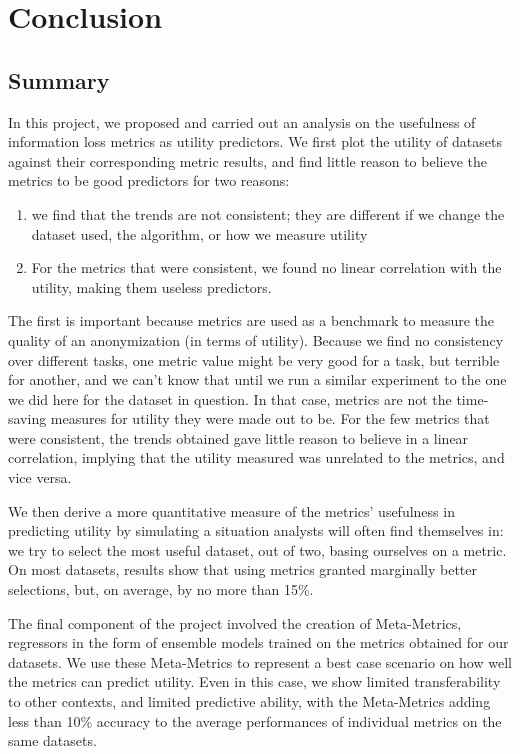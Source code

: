 \chapter{Conclusion}

\section{Summary}
In this project, we proposed and carried out an analysis on the usefulness of information loss metrics as utility predictors. We first plot the utility of datasets against their corresponding metric results, and find little reason to believe the metrics to be good predictors for two reasons:

\begin{enumerate}
    \item we find that the trends are not consistent; they are different if we change the dataset used, the algorithm, or how we measure utility 
    \item For the metrics that were consistent, we found no linear correlation with the utility, making them useless predictors.
\end{enumerate}

The first is important because metrics are used as a benchmark to measure the quality of an anonymization (in terms of utility). Because we find no consistency over different tasks, one metric value might be very good for a task, but terrible for another, and we can't know that until we run a similar experiment to the one we did here for the dataset in question. In that case, metrics are not the time-saving measures for utility they were made out to be. For the few metrics that were consistent, the trends obtained gave little reason to believe in a linear correlation, implying that the utility measured was unrelated to the metrics, and vice versa.

We then derive a more quantitative measure of the metrics' usefulness in predicting utility by simulating a situation analysts will often find themselves in: we try to select the most useful dataset, out of two, basing ourselves on a metric. On most datasets, results show that using metrics granted marginally better selections, but, on average, by no more than 15\%.

The final component of the project involved the creation of Meta-Metrics, regressors in the form of ensemble models trained on the metrics obtained for our datasets. We use these Meta-Metrics to represent a best case scenario on how well the metrics can predict utility. Even in this case, we show limited transferability to other contexts, and limited predictive ability, with the Meta-Metrics adding less than 10\% accuracy to the average performances of individual metrics on the same datasets.



